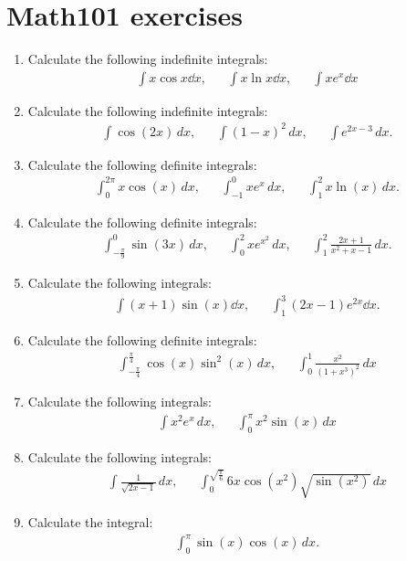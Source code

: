 \newpage
\section{Math101 exercises}

\begin{enumerate}
	\item \label{it:int21} Calculate the following indefinite integrals:
	\begin{align*}
	\int x\cos x\dd x,&& \int x\ln x\dd x,&& \int xe^x\dd x
	\end{align*}
	
	\item Calculate the following indefinite integrals:
	\begin{align*}
	\int \cos(2x)\, dx,&& \int (1-x)^2\, dx,&& \int e^{2x-3}\, dx.
	\end{align*}
	
	\item Calculate the following definite integrals:
	\begin{align*}
	\int_0^{2\pi} x\cos(x)\, dx,&& \int_{-1}^0 xe^x\, dx,&& \int_1^2 x\ln(x)\, dx.
	\end{align*}
	
	\item Calculate the following definite integrals:
	\begin{align*}
	\int_{-\frac{\pi}{9}}^0 \sin(3x) \, dx,&& \int_0^2 xe^{x^2}\, dx,&& \int_1^2 \frac{2x+1}{x^2+x-1}\, dx.
	\end{align*}
	
	\item Calculate the following integrals:
	\begin{align*}
	\int (x+1)\sin(x) \dd x,&& \int_1^3 (2x-1) e^{2x} \dd x.
	\end{align*}
	
	\item Calculate the following definite integrals:
	\begin{align*}
	\int_{-\frac{\pi}{4}}^{\frac{\pi}{4}} \cos(x)\sin^2(x)\, dx ,&& \int_0^1 \frac{x^2}{(1+x^3)^2}\, dx
	\end{align*}
	
	\item Calculate the following integrals:
	\begin{align*}
	\int x^2e^x\, dx,&& \int_0^\pi x^2\sin(x)\, dx
	\end{align*}
	
	\item Calculate the following integrals:
	\begin{align*}
	\int \frac{1}{\sqrt{2x-1}}\, dx,&& \int_0^{\sqrt{\frac{\pi}{6}}} 6x\cos(x^2)\sqrt{\sin(x^2)}\, dx
	\end{align*}
	
	\item Calculate the integral:
	\begin{align*}
	\int_0^\pi \sin(x)\cos(x)\, dx.
	\end{align*}
\end{enumerate}